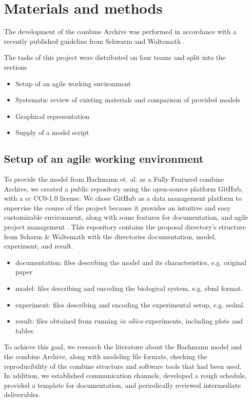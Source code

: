 \section*{Materials and methods} \label{sec:matmet}

The development of the \ac{combine} Archive was performed in accordance with a recently published guideline from Schwarm and Waltemath \cite{combine}.

The tasks of this project were distributed on  four teams and split into the sections 
\begin{itemize}
    \item Setup of an agile working environment
    \item Systematic review of existing materials and comparison of provided models
    \item Graphical representation
    \item Supply of a model script
\end{itemize}

\subsection*{Setup of an agile working environment} \label{setupagwork}
To provide the model from Bachmann et. al. \cite{bachmannmodel} as a Fully Featured \ac{combine} Archive, we created a public repository using the open-source platform GitHub, with a \ac{cc} CC0-1.0 license. We chose GitHub as a data management platform to supervise the course of the project because it provides an intuitive and easy customizable environment, along with some features for documentation, and agile project management \cite{github}. This repository contains the proposal directory's structure from Scharm \& Waltemath \cite{combine} with the directories documentation, model, experiment, and result.
\begin{itemize}
    \item documentation: files describing the model and its characteristics, e.g. original paper
    \item model: files describing and encoding the biological system, e.g. \ac{sbml} format.
    \item experiment: files describing and encoding the experimental setup, e.g. \ac{sedml}.
    \item result: files obtained from running \textit{in silico} experiments, including plots and tables.
\end{itemize}

To achieve this goal, we research the literature about the Bachmann model and the \ac{combine} Archive, along with modeling file formats, checking the reproducibility of the \ac{combine} structure and software tools that had been used. In addition, we established communication channels, developed a rough schedule, provided a template for documentation, and periodically reviewed intermediate deliverables.

